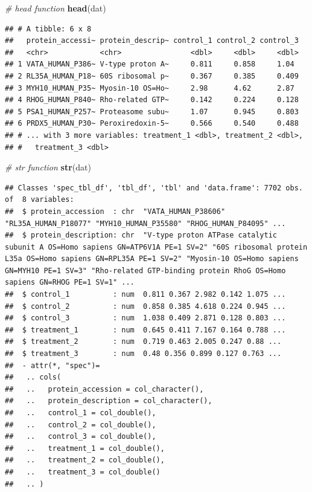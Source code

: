 \documentclass[12pt,]{book}
\newenvironment{Shaded}{\begin{snugshade}}{\end{snugshade}}
\newcommand{\CommentTok}[1]{\textcolor[rgb]{0.56,0.35,0.01}{\textit{#1}}}
\newcommand{\KeywordTok}[1]{\textcolor[rgb]{0.13,0.29,0.53}{\textbf{#1}}}
\newcommand{\NormalTok}[1]{#1}
\begin{document}
\begin{Shaded}
\begin{Highlighting}[]
\CommentTok{# head function}
\KeywordTok{head}\NormalTok{(dat)}
\end{Highlighting}
\end{Shaded}

\begin{verbatim}
## # A tibble: 6 x 8
##   protein_accessi~ protein_descrip~ control_1 control_2 control_3
##   <chr>            <chr>                <dbl>     <dbl>     <dbl>
## 1 VATA_HUMAN_P386~ V-type proton A~     0.811     0.858     1.04 
## 2 RL35A_HUMAN_P18~ 60S ribosomal p~     0.367     0.385     0.409
## 3 MYH10_HUMAN_P35~ Myosin-10 OS=Ho~     2.98      4.62      2.87 
## 4 RHOG_HUMAN_P840~ Rho-related GTP~     0.142     0.224     0.128
## 5 PSA1_HUMAN_P257~ Proteasome subu~     1.07      0.945     0.803
## 6 PRDX5_HUMAN_P30~ Peroxiredoxin-5~     0.566     0.540     0.488
## # ... with 3 more variables: treatment_1 <dbl>, treatment_2 <dbl>,
## #   treatment_3 <dbl>
\end{verbatim}

\begin{Shaded}
\begin{Highlighting}[]
\CommentTok{# str function}
\KeywordTok{str}\NormalTok{(dat)}
\end{Highlighting}
\end{Shaded}

\begin{verbatim}
## Classes 'spec_tbl_df', 'tbl_df', 'tbl' and 'data.frame': 7702 obs. of  8 variables:
##  $ protein_accession  : chr  "VATA_HUMAN_P38606" "RL35A_HUMAN_P18077" "MYH10_HUMAN_P35580" "RHOG_HUMAN_P84095" ...
##  $ protein_description: chr  "V-type proton ATPase catalytic subunit A OS=Homo sapiens GN=ATP6V1A PE=1 SV=2" "60S ribosomal protein L35a OS=Homo sapiens GN=RPL35A PE=1 SV=2" "Myosin-10 OS=Homo sapiens GN=MYH10 PE=1 SV=3" "Rho-related GTP-binding protein RhoG OS=Homo sapiens GN=RHOG PE=1 SV=1" ...
##  $ control_1          : num  0.811 0.367 2.982 0.142 1.075 ...
##  $ control_2          : num  0.858 0.385 4.618 0.224 0.945 ...
##  $ control_3          : num  1.038 0.409 2.871 0.128 0.803 ...
##  $ treatment_1        : num  0.645 0.411 7.167 0.164 0.788 ...
##  $ treatment_2        : num  0.719 0.463 2.005 0.247 0.88 ...
##  $ treatment_3        : num  0.48 0.356 0.899 0.127 0.763 ...
##  - attr(*, "spec")=
##   .. cols(
##   ..   protein_accession = col_character(),
##   ..   protein_description = col_character(),
##   ..   control_1 = col_double(),
##   ..   control_2 = col_double(),
##   ..   control_3 = col_double(),
##   ..   treatment_1 = col_double(),
##   ..   treatment_2 = col_double(),
##   ..   treatment_3 = col_double()
##   .. )
\end{verbatim}
\end{document}
